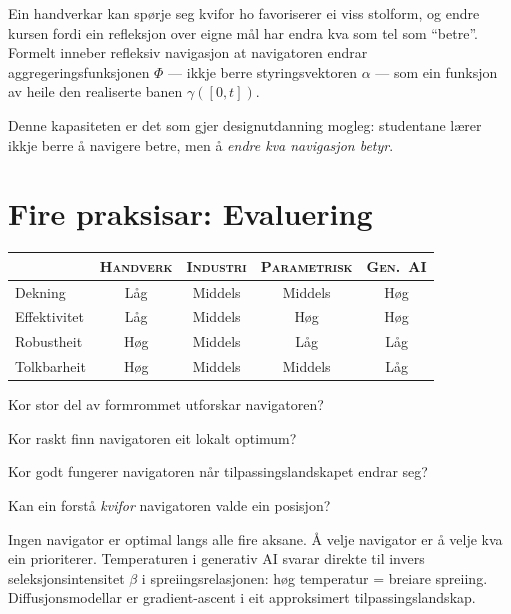 Ein handverkar kan spørje seg kvifor ho favoriserer ei viss
stolform, og endre kursen fordi ein refleksjon over eigne mål har
endra kva som tel som ``betre''. Formelt inneber refleksiv
navigasjon at navigatoren endrar aggregeringsfunksjonen $\Phi$ ---
ikkje berre styringsvektoren $\alpha$ --- som ein funksjon av
heile den realiserte banen $\gamma([0, t])$.

Denne kapasiteten er det som gjer designutdanning mogleg: studentane
lærer ikkje berre å navigere betre, men å \emph{endre kva
navigasjon betyr}.


\section{Fire praksisar: Evaluering}

\medskip
\begin{center}
{\footnotesize
\begin{tabular}{@{}lcccc@{}}
\toprule
& \textsc{Handverk} & \textsc{Industri}
  & \textsc{Parametrisk} & \textsc{Gen.\ AI} \\
\midrule
Dekning & Låg & Middels & Middels & Høg \\
Effektivitet & Låg & Middels & Høg & Høg \\
Robustheit & Høg & Middels & Låg & Låg \\
Tolkbarheit & Høg & Middels & Middels & Låg \\
\bottomrule
\end{tabular}
}
\end{center}

\medskip
\begin{description}[nosep]
  \item[Dekning:] Kor stor del av formrommet utforskar navigatoren?
  \item[Effektivitet:] Kor raskt finn navigatoren eit lokalt
    optimum?
  \item[Robustheit:] Kor godt fungerer navigatoren når
    tilpassingslandskapet endrar seg?
  \item[Tolkbarheit:] Kan ein forstå \emph{kvifor} navigatoren
    valde ein posisjon?
\end{description}

\medskip
Ingen navigator er optimal langs alle fire aksane. Å velje
navigator er å velje kva ein prioriterer. Temperaturen i generativ
AI svarar direkte til invers seleksjonsintensitet $\beta$ i
spreiingsrelasjonen: høg temperatur = breiare spreiing.
Diffusjonsmodellar er gradient-ascent i eit approksimert
tilpassingslandskap.


